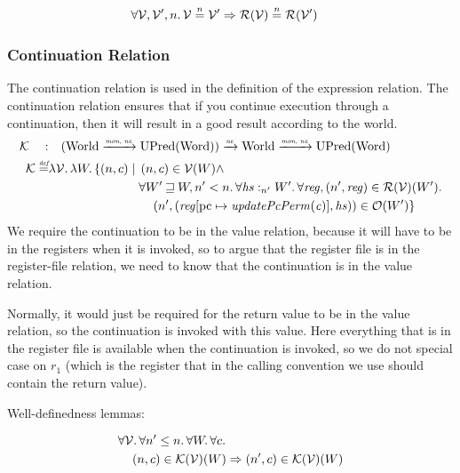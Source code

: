 \documentclass{article}
\newcommand{\update}[2]{[#1 \mapsto #2]}
\newcommand{\monnefun}{\xrightarrow{\textit{\tiny{mon, ne}}}}
\newcommand{\nefun}{\xrightarrow{\textit{\tiny{ne}}}}
\newcommand{\defeq}{\stackrel{\textit{\tiny{def}}}{=}}
\newcommand{\nequal}[1][n]{\stackrel{\tiny{#1}}{=}}
\newcommand{\var}[1]{\mathit{#1}}
\newcommand{\hs}{\var{hs}}
\newcommand{\pcreg}{\mathrm{pc}}
\newcommand{\reg}{\var{reg}}
\newcommand{\heap}{\var{heap}}
\newcommand{\plainfun}[2]{
  \ifthenelse{\equal{#2}{}}
             {\mathit{#1}}
             {\mathit{#1}(#2)}
}
\newcommand{\updatePcPerm}[1]{\plainfun{updatePcPerm}{#1}}
\newcommand{\future}{\mathbin{\sqsupseteq}}
\newcommand{\heapSat}[3][\heap]{#1 :_{#2} #3}
\newcommand{\asmType}{\plaindom{AsmType}}
\newcommand{\plaindom}[1]{\mathrm{#1}}
\newcommand{\Words}{\plaindom{Word}}
\newcommand{\Worlds}{\plaindom{World}}
\newcommand{\UPred}[1]{\plaindom{UPred}(#1)}
\newcommand{\intr}[2]{\mathcal{#1}}
\newcommand{\valueintr}[1]{\intr{V}{#1}}
\newcommand{\contintr}[1]{\intr{K}{#1}}
\newcommand{\regintr}[1]{\intr{R}{#1}}
\newcommand{\stdvr}{\valueintr{\asmType}}
\newcommand{\stdrr}{\regintr{\asmType}}
\newcommand{\stdkr}{\contintr{\asmType}}
\newcommand{\observations}{\mathcal{O}}
\newcommand{\npair}[2][n]{\left(#1,#2 \right)}
\begin{document}
\begin{lemma}
\label{lem:reg-ne-vr}
\begin{align*}
  &\forall \stdvr, \stdvr', n \ldotp \stdvr \nequal \stdvr' \Rightarrow \stdrr(\stdvr) \nequal \stdrr(\stdvr')
\end{align*}
\end{lemma}

\subsubsection{Continuation Relation}
\label{subsubsec:continuation-relation}
The continuation relation is used in the definition of the expression relation. The continuation relation ensures that if you continue execution through a continuation, then it will result in a good result according to the world.
\begin{align*}
  \stdkr \quad : & \quad (\Worlds \monnefun \UPred{\Words}) \nefun \Worlds \monnefun \UPred{\Words} \\
  \stdkr \defeq & \lambda \stdvr \ldotp \lambda W \ldotp\{ \npair{c} \mid
                     \begin{aligned}[t]
                       & \npair{c} \in \stdvr(W) \land \\
                       &  \forall W' \future W, n' < n\ldotp %
                       \forall \heapSat[\hs]{n'}{W'} \ldotp \forall \reg, \npair[n']{\reg} \in \stdrr(\stdvr)(W') \ldotp \\
                       & \quad \npair[n']{(\reg\update{\pcreg}{\updatePcPerm{\var{c}}},\hs)} \in \observations(W') \}
                 \end{aligned}
\end{align*}
We require the continuation to be in the value relation, because it will have to be in the registers when it is invoked, so to argue that the register file is in the register-file relation, we need to know that the continuation is in the value relation.

Normally, it would just be required for the return value to be in the value relation, so the continuation is invoked with this value. Here everything that is in the register file is available when the continuation is invoked, so we do not special case on $r_1$ (which is the register that in the calling convention we use should contain the return value). 


Well-definedness lemmas:
\begin{lemma}
\label{lem:stdkr-dc}
  \begin{align*}
    &\forall \stdvr \ldotp \forall n' \leq n \ldotp \forall W \ldotp \forall c \ldotp\\
    &\quad \npair{c} \in \stdkr(\stdvr)(W) \Rightarrow \npair[n']{c} \in \stdkr(\stdvr)(W)
  \end{align*}
\end{lemma}
\end{document}
